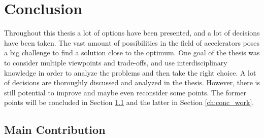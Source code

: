 \documentclass[mscthesis]{usiinfthesis}
\begin{document}
\chapter{Conclusion}
\label{ch:conc}
\glsresetall %

Throughout this thesis a lot of options have been presented, and a lot of
decisions have been taken. The vast amount of possibilities in the field of
accelerators poses a big challenge to find a solution close to the optimum.
One goal of the thesis was to consider multiple viewpoints and trade-offs, and
use interdisciplinary knowledge in order to analyze the problems and then take
the right choice. A lot of decisions are thoroughly discussed and analyzed in
the thesis. However, there is still potential to improve and maybe even
reconsider some points. The former points will be concluded in Section
\ref{ch:conc_ach} and the latter in Section \ref{ch:conc_work}.

\section{Main Contribution}
\label{ch:conc_ach}
\end{document}
